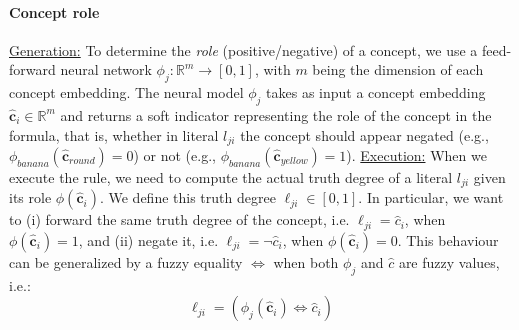 \paragraph{Concept role}
\underline{Generation:} To determine the \emph{role} (positive/negative) of a concept, we use a feed-forward neural network $\phi_j: \mathbb{R}^m \rightarrow [0,1]$, with $m$ being the dimension of each concept embedding.
The neural model $\phi_j$ takes as input a concept embedding $\hat{\mathbf{c}}_i \in \mathbb{R}^m$ and returns a soft indicator representing the role of the concept in the formula, that is, whether in literal $l_{ji}$ the concept should appear negated (e.g., $\phi_{\textit{banana}}(\hat{\mathbf{c}}_{\textit{round}}) = 0$)  or not (e.g., $\phi_{\textit{banana}}(\hat{\mathbf{c}}_{\textit{yellow}}) = 1$).
\underline{Execution:} When we execute the rule, we need to compute the actual truth degree of a literal $l_{ji}$ given its role $\phi(\hat{\mathbf{c}}_i)$. We define this truth degree  $\ell_{ji} \in [0,1]$. In particular, we want to (i) forward the same truth degree of the concept, i.e.  $\ell_{ji} = \hat{c}_i$,  when $\phi(\hat{\mathbf{c}}_i)=1$,  and (ii) negate it, i.e. $\ell_{ji} = \neg \hat{c}_i$,  when $\phi(\hat{\mathbf{c}}_i)=0$.
This behaviour can be generalized by a fuzzy equality $\Leftrightarrow $ when both $\phi_j$ and $\hat{c}$ are fuzzy values, i.e.: 
\begin{equation}
    \label{eq:iff}
     \ell_{ji} = (\phi_j(\hat{\mathbf{c}}_i) \Leftrightarrow \hat{c}_{i})
\end{equation}
